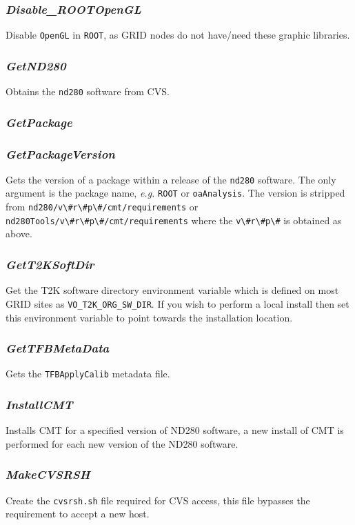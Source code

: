 \documentclass[11pt]{article}
\begin{document}
\subsubsection*{\textit{Disable\_ROOTOpenGL}}
Disable \verb+OpenGL+ in \verb+ROOT+, as GRID nodes do not have/need
these graphic libraries. 

\subsubsection*{\textit{GetND280}}
Obtains the \verb+nd280+ software from CVS.

\subsubsection*{\textit{GetPackage}}

\subsubsection*{\textit{GetPackageVersion}}
Gets the version of a package within a release of the \verb+nd280+ software. The only
argument is the package name, \textit{e.g.} \verb+ROOT+ or
\verb+oaAnalysis+. The version is stripped from
\verb+nd280/v\#r\#p\#/cmt/requirements+ or
\verb+nd280Tools/v\#r\#p\#/cmt/requirements+ where the
\verb+v\#r\#p\#+ is obtained as above. 

\subsubsection*{\textit{GetT2KSoftDir}}
Get the T2K software directory environment variable which is defined
on most GRID sites as \verb+VO_T2K_ORG_SW_DIR+. If you wish to perform a
local install then set this environment variable to point towards the
installation location.

\subsubsection*{\textit{GetTFBMetaData}}
Gets the \verb+TFBApplyCalib+ metadata file.

\subsubsection*{\textit{InstallCMT}}
Installs CMT for a specified version of ND280 software, a new install
of CMT is performed for each new version of the ND280 software.

\subsubsection*{\textit{MakeCVSRSH}}
Create the \verb+cvsrsh.sh+ file required for CVS access, this file bypasses
the requirement to accept a new host.
\end{document}

